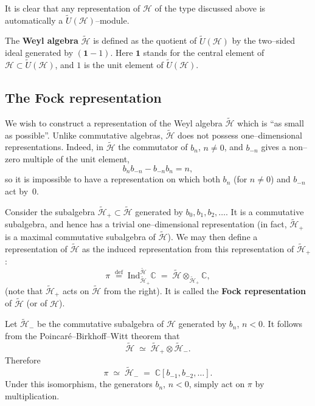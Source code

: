 \documentclass[12pt]{article}
\begin{document}
It is clear that any representation of $\mathcal{H}$ of the type discussed above is automatically a $\widetilde{U}(\mathcal{H})$–module.


\begin{definition}
    The \textbf{Weyl algebra} $\widetilde{\mathcal{H}}$ is defined as the quotient of $\widetilde{U}(\mathcal{H})$ by the two–sided ideal generated by $(\mathbf{1}-1)$.
    Here $\mathbf{1}$ stands for the central element of $\mathcal{H}\subset\widetilde{U}(\mathcal{H})$, and $1$ is the unit element of $\widetilde{U}(\mathcal{H})$.
\end{definition}

\subsection{The Fock representation}
We wish to construct a representation of the Weyl algebra $\widetilde{\mathcal{H}}$ which is ``as small as possible''.
Unlike commutative algebras, $\widetilde{\mathcal{H}}$ does not possess one–dimensional representations.
Indeed, in $\widetilde{\mathcal{H}}$ the commutator of $b_n$, $n\ne 0$, and $b_{-n}$ gives a non–zero multiple of the unit element,
\begin{equation}\label{2.1.5}
    b_n b_{-n} - b_{-n} b_n = n,
\end{equation}
so it is impossible to have a representation on which both $b_n$ (for $n\ne 0$) and $b_{-n}$ act by~$0$.

\medskip

Consider the subalgebra $\widetilde{\mathcal{H}}_+ \subset \widetilde{\mathcal{H}}$ generated by $b_0, b_1, b_2, \dots$.
It is a commutative subalgebra, and hence has a trivial one–dimensional representation
(in fact, $\widetilde{\mathcal{H}}_+$ is a maximal commutative subalgebra of $\widetilde{\mathcal{H}}$).
We may then define a representation of $\widetilde{\mathcal{H}}$ as the induced representation from this representation of $\widetilde{\mathcal{H}}_+$:
\[
    \pi \;\stackrel{\mathrm{def}}{=}\;
    \mathrm{Ind}_{\widetilde{\mathcal{H}}_+}^{\widetilde{\mathcal{H}}} \mathbb{C}
    \;=\;
    \widetilde{\mathcal{H}} \otimes_{\widetilde{\mathcal{H}}_+} \mathbb{C},
\]
(note that $\widetilde{\mathcal{H}}_+$ acts on $\widetilde{\mathcal{H}}$ from the right).
It is called the \textbf{Fock representation} of $\widetilde{\mathcal{H}}$ (or of $\mathcal{H}$).

\medskip

Let $\widetilde{\mathcal{H}}_-$ be the commutative subalgebra of $\mathcal{H}$ generated by $b_n$, $n < 0$.
It follows from the Poincaré–Birkhoff–Witt theorem that
\[
    \widetilde{\mathcal{H}} \;\simeq\;
    \widetilde{\mathcal{H}}_+ \otimes \widetilde{\mathcal{H}}_-.
\]
Therefore
\[
    \pi \;\simeq\; \widetilde{\mathcal{H}}_- \;=\; \mathbb{C}[b_{-1}, b_{-2}, \dots].
\]
Under this isomorphism, the generators $b_n$, $n<0$, simply act on $\pi$ by multiplication.
\end{document}
